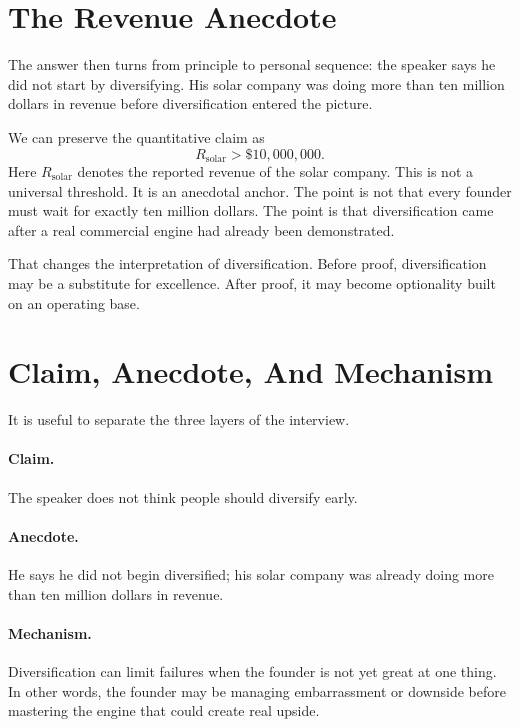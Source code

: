 \section{The Revenue Anecdote}

The answer then turns from principle to personal sequence: the speaker says he did not start by diversifying. His solar company was doing more than ten million dollars in revenue before diversification entered the picture.

We can preserve the quantitative claim as
\begin{equation}
R_{\mathrm{solar}} > \$10{,}000{,}000.
\end{equation}
Here \(R_{\mathrm{solar}}\) denotes the reported revenue of the solar company. This is not a universal threshold. It is an anecdotal anchor. The point is not that every founder must wait for exactly ten million dollars. The point is that diversification came after a real commercial engine had already been demonstrated.

That changes the interpretation of diversification. Before proof, diversification may be a substitute for excellence. After proof, it may become optionality built on an operating base.

\section{Claim, Anecdote, And Mechanism}

It is useful to separate the three layers of the interview.

\paragraph{Claim.}
The speaker does not think people should diversify early.

\paragraph{Anecdote.}
He says he did not begin diversified; his solar company was already doing more than ten million dollars in revenue.

\paragraph{Mechanism.}
Diversification can limit failures when the founder is not yet great at one thing. In other words, the founder may be managing embarrassment or downside before mastering the engine that could create real upside.

